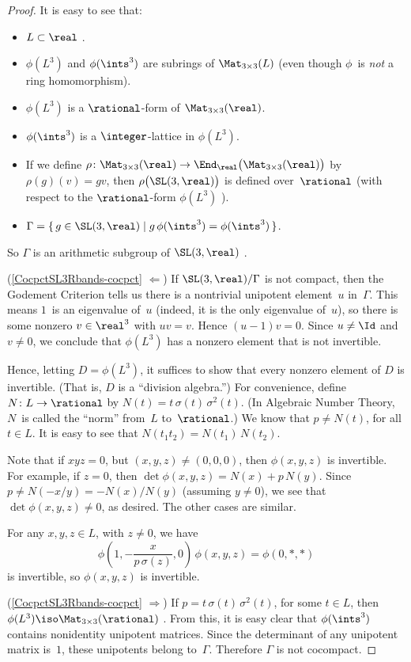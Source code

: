 \begin{proof}
 It is easy to see that:
 \begin{itemize}
 \item $L \subset \real$ .
 \item $\phi(L^3)$ and $\phi(\ints^3)$ are subrings
of $\Mat_{3 \times 3}(L)$ (even though $\phi$~is \emph{not}
a ring homomorphism).
 \item $\phi(L^3)$ is a $\rational$-form of $\Mat_{3 \times
3}(\real)$.
 \item $\phi(\ints^3)$ is a $\integer$-lattice in
$\phi(L^3)$.
 \item If we define $\rho \colon \Mat_{3 \times 3}(\real) \to
\End_{\real} \bigl( \Mat_{3 \times 3}(\real) \bigr)$ by
$\rho(g)(v) = gv$, then $\rho \bigl( \SL(3,\real) \bigr)$ is
defined over~$\rational$ (with respect to the
$\rational$-form $\phi(L^3)$ ).
 \item $\Gamma = \{\, g \in \SL(3,\real)
\mid g \, \phi(\ints^3) = \phi(\ints^3) \,\}$.
 \end{itemize}
 So $\Gamma$ is an arithmetic subgroup of $\SL(3,\real)$
.

(\ref{CocpctSL3Rbands-cocpct} $\Leftarrow$)
 If $\SL(3,\real)/\Gamma$ is not compact, then the Godement Criterion  tells us there is a nontrivial
unipotent element~$u$ in~$\Gamma$. 
 This means $1$~is an eigenvalue of~$u$ (indeed, it is the
only eigenvalue of~$u$), so there is some nonzero $v
\in \real^3$ with $uv = v$. Hence $(u-1)v = 0$. Since $u
\neq \Id$ and $v \neq 0$, we conclude that $\phi(L^3)$ has a
nonzero element that is not invertible.

Hence, letting $D = \phi(L^3)$, it suffices to show that every nonzero element of $D$ is
invertible. (That is, $D$ is a
``division algebra\zz.'') For convenience, define $N \colon L \to
\rational$ by $N(t) = t \, \sigma(t) \, \sigma^2(t)$.
(In Algebraic Number Theory, $N$~is called the ``norm'' from~$L$ to~$\rational$.) We know that $p \neq N(t)$, for all
$t \in L$. It is easy to see that $N(t_1 t_2) = N(t_1) \,
N(t_2)$.
 
Note that if $xyz = 0$, but $(x,y,z) \neq (0,0,0)$, then
$\phi(x,y,z)$ is invertible. For example, if $z = 0$, then
$\det \phi(x,y,z) = N(x) + p\, N(y)$. Since $p \neq N(-x/y)
= -N(x)/N(y)$ (assuming $y \neq 0$), we see that $\det
\phi(x,y,z) \neq 0$, as desired. The other cases are
similar.

For any $x,y,z \in L$, with $z \neq 0$, we have
 $$ \phi \left( 1, - \frac{x}{p\, \sigma(z)}, 0 \right)
 \, \phi(x,y,z)
 = \phi(0,*,*)$$
 is invertible, so $\phi(x,y,z)$ is invertible.

(\ref{CocpctSL3Rbands-cocpct} $\Rightarrow$)
 If $p = t \, \sigma(t) \, \sigma^2(t)$, for some $t \in
L$, then $\phi(L^3) \iso \Mat_{3 \times
3}(\rational)$ . 
From this, it is easy clear that
$\phi(\ints^3)$ contains nonidentity unipotent matrices. 
Since the determinant of any unipotent matrix is~$1$, these unipotents
belong to~$\Gamma$.
Therefore $\Gamma$ is not cocompact.
 \end{proof}


